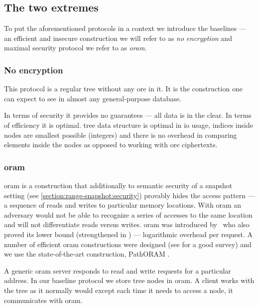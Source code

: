 \subsection{The two extremes}

	To put the aforementioned protocols in a context we introduce the baselines --- an efficient and insecure construction we will refer to as \emph{no encryption} and maximal security protocol we refer to as \emph{\acrshort{oram}}.

	\subsubsection{No encryption}

		This protocol is a regular {\BPlus} tree \cite{b-tree} without any \acrshort{ore} in it.
		It is the construction one can expect to see in almost any general-purpose database.

		In terms of security it provides no guarantees --- all data is in the clear.
		In terms of efficiency it is optimal.
		{\BPlus} tree data structure is optimal in \acrshort{io} usage, indices inside nodes are smallest possible (integers) and there is no overhead in comparing elements inside the nodes as opposed to working with \acrshort{ore} ciphertexts.

	\subsubsection{\texorpdfstring{\acrshort{oram}}{ORAM}}\label{section:range-snapshot:oram}

		\acrfull{oram} is a construction that additionally to semantic security of a snapshot setting (see \cref{section:range-snapshot:security}) provably hides the access pattern --- a sequence of reads and writes to particular memory locations.
		With \acrshort{oram} an adversary would not be able to recognize a series of accesses to the same location and will not differentiate reads versus writes.
		\acrshort{oram} was introduced by~\textcite{oram-original} who also proved its lower bound (strengthened in \cite{oram-tighter-lower-bound}) --- logarithmic overhead per request.
		A number of efficient \acrshort{oram} constructions were designed (see \cite{oram-survey-feifei} for a good survey) and we use the state-of-the-art construction, PathORAM \cite{path-oram}.

		A generic \acrshort{oram} server responds to read and write requests for a particular address.
		In our baseline protocol we store {\BPlus} tree nodes in \acrshort{oram}.
		A client works with the tree as it normally would except each time it needs to access a node, it communicates with \acrshort{oram}.

